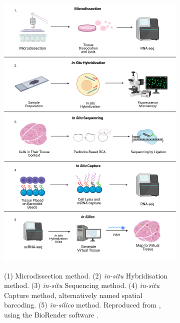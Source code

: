 \begin{figure}
     \centering
     \begin{subfigure}[p]{0.45\textwidth}
         \centering
         \includegraphics[width=\textwidth]{figures/biological_introduction/Spatial_Transcriptomics_Overview.png}
         \label{subfig:spatial-transcriptomic}
         \caption[\textbf{Overview of Spatial Transcriptomics Methods}]{(1) Microdissection method. (2) \textit{in-situ} Hybridisation method. (3) \textit{in-situ} Sequencing method. (4) \textit{in-situ} Capture method, alternatively named spatial barcoding. (5) \textit{in-silico} method. Reproduced from \autocite[Fig .1]{slifertheryedragon23}, using the BioRender software \autocite{biorender}.}
     \end{subfigure}
     \hfill
     \begin{subfigure}[p]{0.45\textwidth}

\end{subfigure}
\end{figure}
